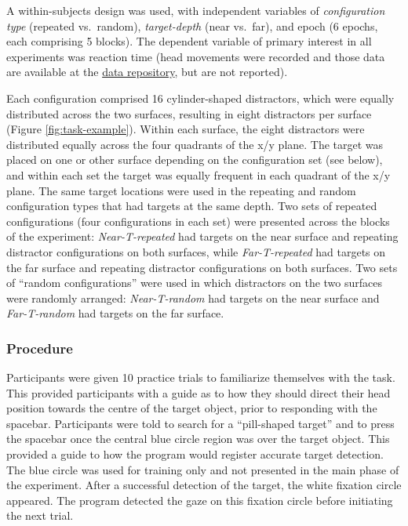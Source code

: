 \documentclass[
  english,
  man,floatsintext]{apa7}
\begin{document}
A within-subjects design was used, with independent variables of \emph{configuration type} (repeated vs.~random), \emph{target-depth} (near vs.~far), and epoch (6 epochs, each comprising 5 blocks). The dependent variable of primary interest in all experiments was reaction time (head movements were recorded and those data are available at the \href{https://github.com/tombeesley/CCVR}{data repository}, but are not reported).

Each configuration comprised 16 cylinder-shaped distractors, which were equally distributed across the two surfaces, resulting in eight distractors per surface (Figure \ref{fig:task-example}). Within each surface, the eight distractors were distributed equally across the four quadrants of the x/y plane. The target was placed on one or other surface depending on the configuration set (see below), and within each set the target was equally frequent in each quadrant of the x/y plane. The same target locations were used in the repeating and random configuration types that had targets at the same depth. Two sets of repeated configurations (four configurations in each set) were presented across the blocks of the experiment: \emph{Near-T-repeated} had targets on the near surface and repeating distractor configurations on both surfaces, while \emph{Far-T-repeated} had targets on the far surface and repeating distractor configurations on both surfaces. Two sets of ``random configurations'' were used in which distractors on the two surfaces were randomly arranged: \emph{Near-T-random} had targets on the near surface and \emph{Far-T-random} had targets on the far surface.

\hypertarget{procedure}{%
\subsubsection{Procedure}\label{procedure}}

Participants were given 10 practice trials to familiarize themselves with the task. This provided participants with a guide as to how they should direct their head position towards the centre of the target object, prior to responding with the spacebar. Participants were told to search for a ``pill-shaped target'' and to press the spacebar once the central blue circle region was over the target object. This provided a guide to how the program would register accurate target detection. The blue circle was used for training only and not presented in the main phase of the experiment. After a successful detection of the target, the white fixation circle appeared. The program detected the gaze on this fixation circle before initiating the next trial.
\end{document}
